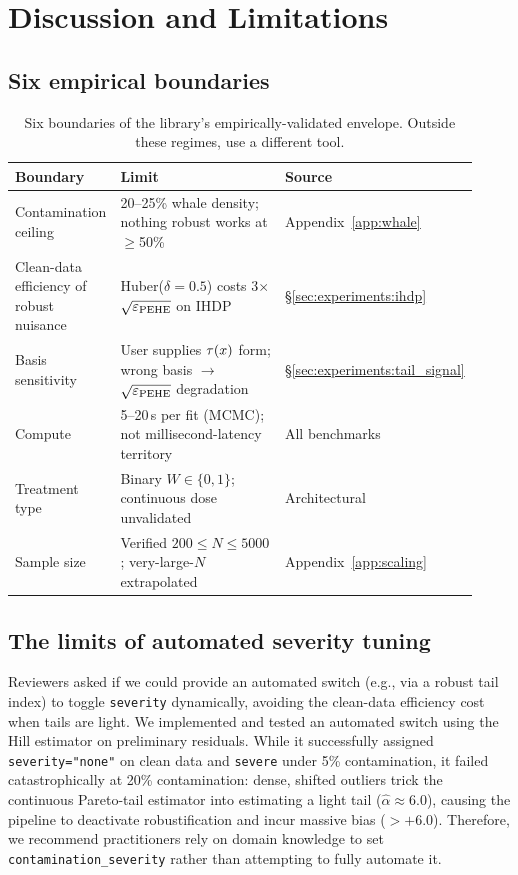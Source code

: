 \section{Discussion and Limitations}
\label{sec:discussion}

\subsection{Six empirical boundaries}
\begin{table}[!t]
\centering
\small
\begin{tabular}{p{0.22\linewidth}p{0.48\linewidth}p{0.22\linewidth}}
\toprule
Boundary & Limit & Source \\
\midrule
Contamination ceiling
    & 20--25\% whale density; nothing robust works at $\geq$50\%
    & Appendix~\ref{app:whale} \\
Clean-data efficiency of robust nuisance
    & Huber($\delta=0.5$) costs 3$\times$ $\sqrt{\varepsilon_{\mathrm{PEHE}}}$ on IHDP
    & \S\ref{sec:experiments:ihdp} \\
Basis sensitivity
    & User supplies $\tau(x)$ form; wrong basis $\to$ $\sqrt{\varepsilon_{\mathrm{PEHE}}}$ degradation
    & \S\ref{sec:experiments:tail_signal} \\
Compute
    & 5--20\,s per fit (MCMC); not millisecond-latency territory
    & All benchmarks \\
Treatment type
    & Binary $W \in \{0, 1\}$; continuous dose unvalidated
    & Architectural \\
Sample size
    & Verified $200 \leq N \leq 5000$; very-large-$N$ extrapolated
    & Appendix~\ref{app:scaling} \\
\bottomrule
\end{tabular}
\caption{Six boundaries of the library's empirically-validated
envelope. Outside these regimes, use a different tool.}
\label{tab:boundaries}
\end{table}

\subsection{The limits of automated severity tuning}
Reviewers asked if we could provide an automated switch (e.g., via a robust
tail index) to toggle \texttt{severity} dynamically, avoiding the clean-data
efficiency cost when tails are light. We implemented and tested an automated
switch using the Hill estimator on preliminary residuals. While it successfully
assigned \texttt{severity="none"} on clean data and \texttt{severe} under
5\% contamination, it failed catastrophically at 20\% contamination: dense,
shifted outliers trick the continuous Pareto-tail estimator into estimating
a light tail ($\hat{\alpha} \approx 6.0$), causing the pipeline to deactivate
robustification and incur massive bias ($>+6.0$). Therefore, we recommend
practitioners rely on domain knowledge to set \texttt{contamination\_severity}
rather than attempting to fully automate it.

